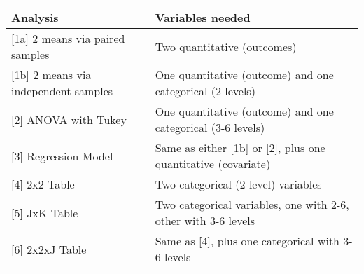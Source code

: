 \documentclass[]{book}
\theoremstyle{definition}
\theoremstyle{definition}
\theoremstyle{definition}
\theoremstyle{remark}
\begin{document}
\begin{longtable}[]{@{}ll@{}}
\toprule
\begin{minipage}[b]{0.42\columnwidth}\raggedright
Analysis\strut
\end{minipage} & \begin{minipage}[b]{0.52\columnwidth}\raggedright
Variables needed\strut
\end{minipage}\tabularnewline
\midrule
\endhead
\begin{minipage}[t]{0.42\columnwidth}\raggedright
{[}1a{]} 2 means via paired samples\strut
\end{minipage} & \begin{minipage}[t]{0.52\columnwidth}\raggedright
Two quantitative (outcomes)\strut
\end{minipage}\tabularnewline
\begin{minipage}[t]{0.42\columnwidth}\raggedright
{[}1b{]} 2 means via independent samples\strut
\end{minipage} & \begin{minipage}[t]{0.52\columnwidth}\raggedright
One quantitative (outcome) and one categorical (2 levels)\strut
\end{minipage}\tabularnewline
\begin{minipage}[t]{0.42\columnwidth}\raggedright
{[}2{]} ANOVA with Tukey\strut
\end{minipage} & \begin{minipage}[t]{0.52\columnwidth}\raggedright
One quantitative (outcome) and one categorical (3-6 levels)\strut
\end{minipage}\tabularnewline
\begin{minipage}[t]{0.42\columnwidth}\raggedright
{[}3{]} Regression Model\strut
\end{minipage} & \begin{minipage}[t]{0.52\columnwidth}\raggedright
Same as either {[}1b{]} or {[}2{]}, plus one quantitative
(covariate)\strut
\end{minipage}\tabularnewline
\begin{minipage}[t]{0.42\columnwidth}\raggedright
{[}4{]} 2x2 Table\strut
\end{minipage} & \begin{minipage}[t]{0.52\columnwidth}\raggedright
Two categorical (2 level) variables\strut
\end{minipage}\tabularnewline
\begin{minipage}[t]{0.42\columnwidth}\raggedright
{[}5{]} JxK Table\strut
\end{minipage} & \begin{minipage}[t]{0.52\columnwidth}\raggedright
Two categorical variables, one with 2-6, other with 3-6 levels\strut
\end{minipage}\tabularnewline
\begin{minipage}[t]{0.42\columnwidth}\raggedright
{[}6{]} 2x2xJ Table\strut
\end{minipage} & \begin{minipage}[t]{0.52\columnwidth}\raggedright
Same as {[}4{]}, plus one categorical with 3-6 levels\strut
\end{minipage}\tabularnewline
\bottomrule
\end{longtable}
\end{document}
